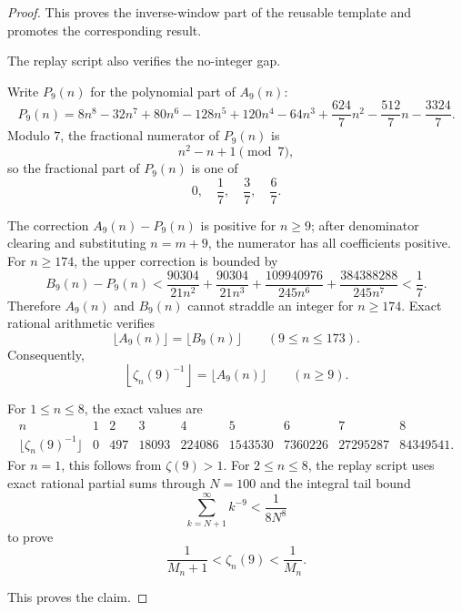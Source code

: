 \begin{proof}
This proves the inverse-window part of the reusable template and promotes the corresponding result.

The replay script also verifies the no-integer gap.

Write \(P_9(n)\) for the polynomial part of \(A_9(n)\):
\[
P_9(n)=8n^8-32n^7+80n^6-128n^5+120n^4-64n^3
+\frac{624}{7}n^2-\frac{512}{7}n-\frac{3324}{7}.
\]
Modulo \(7\), the fractional numerator of \(P_9(n)\) is
\[
n^2-n+1\pmod 7,
\]
so the fractional part of \(P_9(n)\) is one of
\[
0,\quad \frac17,\quad \frac37,\quad \frac67.
\]

The correction \(A_9(n)-P_9(n)\) is positive for \(n\ge9\); after denominator clearing and substituting \(n=m+9\), the numerator has all coefficients positive. For \(n\ge174\), the upper correction is bounded by
\[
B_9(n)-P_9(n)
<
\frac{90304}{21n^2}
+\frac{90304}{21n^3}
+\frac{109940976}{245n^6}
+\frac{384388288}{245n^7}
<\frac17.
\]
Therefore \(A_9(n)\) and \(B_9(n)\) cannot straddle an integer for \(n\ge174\). Exact rational arithmetic verifies
\[
\lfloor A_9(n)\rfloor=\lfloor B_9(n)\rfloor
\qquad(9\le n\le173).
\]
Consequently,
\[
\left\lfloor\zeta_n(9)^{-1}\right\rfloor=\lfloor A_9(n)\rfloor
\qquad(n\ge9).
\]

For \(1\le n\le8\), the exact values are
\[
\begin{array}{c|rrrrrrrr}
n&1&2&3&4&5&6&7&8\\
\hline
\lfloor\zeta_n(9)^{-1}\rfloor&0&497&18093&224086&1543530&7360226&27295287&84349541.
\end{array}
\]
For \(n=1\), this follows from \(\zeta(9)>1\). For \(2\le n\le8\), the replay script uses exact rational partial sums through \(N=100\) and the integral tail bound
\[
\sum_{k=N+1}^{\infty}k^{-9}<\frac{1}{8N^8}
\]
to prove
\[
\frac1{M_n+1}<\zeta_n(9)<\frac1{M_n}.
\]

This proves the claim.
\end{proof}

